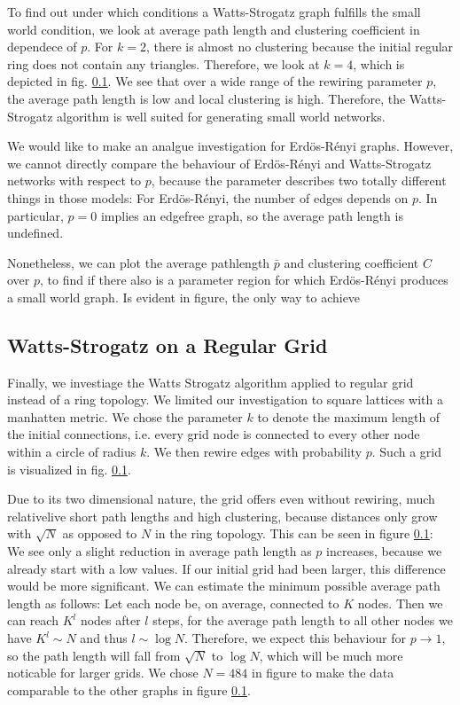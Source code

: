 \documentclass{scrartcl}
\begin{document}
To find out under which conditions a Watts-Strogatz graph fulfills the small world condition, we look at average path length and clustering coefficient in dependece of $p$. For $k=2$, there is almost no clustering because the initial regular ring does not contain any triangles. Therefore, we look at $k=4$, which is depicted in fig. \ref{}. We see that over a wide range of the rewiring parameter $p$, the average path length is low and local clustering is high. Therefore, the Watts-Strogatz algorithm is well suited for generating small world networks.

We would like to make an analgue investigation for Erdös-Rényi graphs. However, we cannot directly compare the behaviour of Erdös-Rényi and Watts-Strogatz networks with respect to $p$, because the parameter describes two totally different things in those models: For Erdös-Rényi, the number of edges depends on $p$. In particular, $p=0$ implies an edgefree graph, so the average path length is undefined. 

Nonetheless, we can plot the average pathlength $\bar{p}$ and clustering coefficient $C$ over $p$, to find if there also is a parameter region for which Erdös-Rényi produces a small world graph. Is evident in figure, the only way to achieve 

\subsection{Watts-Strogatz on a Regular Grid}
Finally, we investiage the Watts Strogatz algorithm applied to regular grid instead of a ring topology. We limited our investigation to square lattices with a manhatten metric. We chose the parameter $k$ to denote the maximum length of the initial connections, i.e. every grid node is connected to every other node within a circle of radius $k$. We then rewire edges with probability $p$. Such a grid is visualized in fig. \ref{}. 

Due to its two dimensional nature, the grid offers even without rewiring, much relativelive short path lengths and high clustering, because distances only grow with $\sqrt{N}$ as opposed to $N$ in the ring topology. This can be seen in figure \ref{}: We see only a slight reduction in average path length as $p$ increases, because we already start with a low values. If our initial grid had been larger, this difference would be more significant. We can estimate the minimum possible average path length as follows:
Let each node be, on average, connected to $K$ nodes. Then we can reach $K^l$ nodes after $l$ steps, for the average path length to all other nodes we have $K^l \sim N$ and thus $l \sim \log N$. Therefore, we expect this behaviour for $p \rightarrow 1$, so the path length will fall from $\sqrt{N}$ to $\log N$, which will be much more noticable for larger grids. We chose $N=484$ in figure to make the data comparable to the other graphs in figure \ref{}. 
\end{document}
